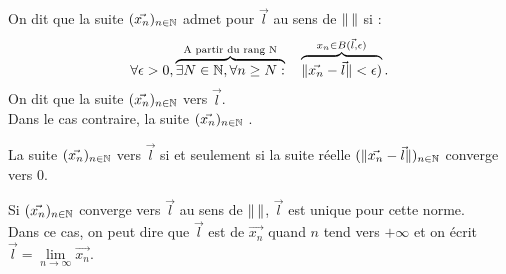 \documentclass{book}
\begin{document}
\begin{Definition}
On dit que la suite $(\vec{x_n})_{n\in\mathbb{N}}$ admet pour  $\vec{l}$ au sens de $\mathopen\lVert \, \mathclose\rVert$ si :
$$\forall  \epsilon > 0,\overbrace{\exists N \in \mathbb{N}, \forall n\geq N :}^{\text{A partir du rang N}}\quad\overbrace{ \mathopen\lVert \vec{x_n} - \vec{l} \mathclose\rVert< \epsilon)}^{x_n\in B(\vec{l},\epsilon)}.$$
On dit que la suite $(\vec{x_n})_{n\in\mathbb{N}}$  vers  $\vec{l}$.\\ 
Dans le cas contraire, la suite $(\vec{x_n})_{n\in\mathbb{N}}$ .\\
\end{Definition}
\begin{Proposition}
La suite $(\vec{x_n})_{n\in\mathbb{N}}$  vers  $\vec{l}$ si et seulement si la suite réelle $(\mathopen\lVert \vec{x_n}-\vec{l} \mathclose\rVert)_{n\in\mathbb{N}}$ converge vers 0.
\end{Proposition}
\begin{DefinitionProposition}
Si $(\vec{x_n})_{n\in\mathbb{N}}$ converge vers $\vec{l}$ au sens de $\mathopen\lVert \, \mathclose\rVert$, $\vec{l}$ est unique pour cette norme.\\
Dans ce cas, on peut dire que $\vec{l}$ est  de $\vec{x_n}$ quand $n$ tend vers $+\infty$ et
on écrit  $\vec{l}=\lim\limits_{n\to\infty}\vec{x_n}$.
\end{DefinitionProposition}
\end{document}
